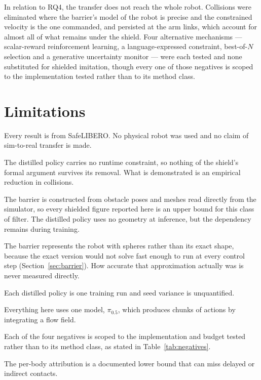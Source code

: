 \documentclass[a4paper,11pt]{report}
\begin{document}
In relation to RQ4, the transfer does not reach the whole robot. Collisions were eliminated where
the barrier's model of the robot is precise and the constrained velocity is the one commanded, and
persisted at the arm links, which account for almost all of what remains under the shield. Four
alternative mechanisms --- scalar-reward reinforcement learning, a language-expressed constraint,
best-of-$N$ selection and a generative uncertainty monitor --- were each tested and none
substituted for shielded imitation, though every one of those negatives is scoped to the
implementation tested rather than to its method class.

\section{Limitations}\label{sec:conc:limitations}

\begin{description}[leftmargin=0pt, labelsep=0.5em, topsep=4pt, itemsep=3pt,
                    parsep=0pt, font=\normalfont\bfseries]
  \item[Simulation only.] Every result is from SafeLIBERO. No physical robot was used and no claim
    of sim-to-real transfer is made.
  \item[No formal guarantee is inherited.] The distilled policy carries no runtime constraint, so
    nothing of the shield's formal argument survives its removal. What is demonstrated is an
    empirical reduction in collisions.
  \item[Privileged geometry.] The barrier is constructed from obstacle poses and meshes read
    directly from the simulator, so every shielded figure reported here is an upper bound for this
    class of filter. The distilled policy uses no geometry at inference, but the dependency remains
    during training.
  \item[Approximate robot model.] The barrier represents the robot with spheres rather than its
    exact shape, because the exact version would not solve fast enough to run at every control step
    (Section~\ref{sec:barrier}). How accurate that approximation actually was is never measured
    directly.
  \item[Single training seed.] Each distilled policy is one training run and seed variance is
    unquantified.
  \item[Single policy and action space.] Everything here uses one model, $\pi_{0.5}$, which
    produces chunks of actions by integrating a flow field.
  \item[Scope of the negative results.] Each of the four negatives is scoped to the implementation
    and budget tested rather than to its method class, as stated in
    Table~\ref{tab:negatives}.
  \item[Attribution caveats.] The per-body attribution is a documented lower bound that can miss
    delayed or indirect contacts.
\end{description}
\end{document}

